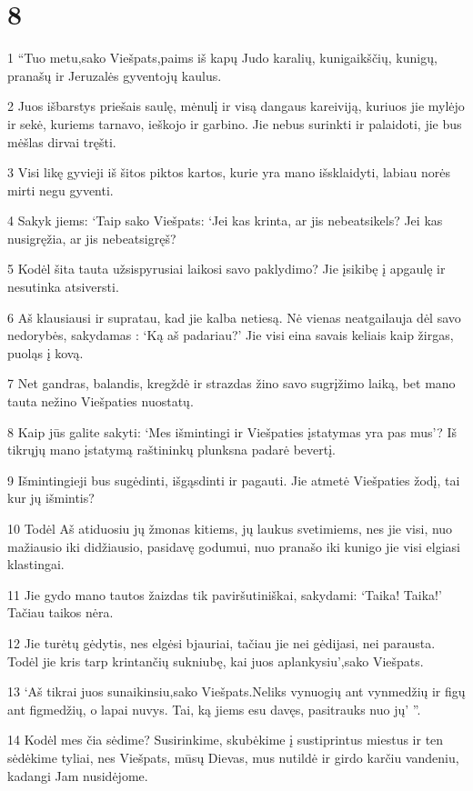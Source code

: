 \chapter{8}


\par 1 “Tuo metu,­sako Viešpats,­paims iš kapų Judo karalių, kunigaikščių, kunigų, pranašų ir Jeruzalės gyventojų kaulus. 
\par 2 Juos išbarstys priešais saulę, mėnulį ir visą dangaus kareiviją, kuriuos jie mylėjo ir sekė, kuriems tarnavo, ieškojo ir garbino. Jie nebus surinkti ir palaidoti, jie bus mėšlas dirvai tręšti. 
\par 3 Visi likę gyvieji iš šitos piktos kartos, kurie yra mano išsklaidyti, labiau norės mirti negu gyventi. 
\par 4 Sakyk jiems: ‘Taip sako Viešpats: ‘Jei kas krinta, ar jis nebeatsikels? Jei kas nusigręžia, ar jis nebeatsigręš? 
\par 5 Kodėl šita tauta užsispyrusiai laikosi savo paklydimo? Jie įsikibę į apgaulę ir nesutinka atsiversti. 
\par 6 Aš klausiausi ir supratau, kad jie kalba netiesą. Nė vienas neatgailauja dėl savo nedorybės, sakydamas : ‘Ką aš padariau?’ Jie visi eina savais keliais kaip žirgas, puoląs į kovą. 
\par 7 Net gandras, balandis, kregždė ir strazdas žino savo sugrįžimo laiką, bet mano tauta nežino Viešpaties nuostatų. 
\par 8 Kaip jūs galite sakyti: ‘Mes išmintingi ir Viešpaties įstatymas yra pas mus’? Iš tikrųjų mano įstatymą raštininkų plunksna padarė bevertį. 
\par 9 Išmintingieji bus sugėdinti, išgąsdinti ir pagauti. Jie atmetė Viešpaties žodį, tai kur jų išmintis? 
\par 10 Todėl Aš atiduosiu jų žmonas kitiems, jų laukus svetimiems, nes jie visi, nuo mažiausio iki didžiausio, pasidavę godumui, nuo pranašo iki kunigo jie visi elgiasi klastingai. 
\par 11 Jie gydo mano tautos žaizdas tik paviršutiniškai, sakydami: ‘Taika! Taika!’ Tačiau taikos nėra. 
\par 12 Jie turėtų gėdytis, nes elgėsi bjauriai, tačiau jie nei gėdijasi, nei parausta. Todėl jie kris tarp krintančių sukniubę, kai juos aplankysiu’,­sako Viešpats. 
\par 13 ‘Aš tikrai juos sunaikinsiu,­sako Viešpats.­Neliks vynuogių ant vynmedžių ir figų ant figmedžių, o lapai nuvys. Tai, ką jiems esu davęs, pasitrauks nuo jų’ ”. 
\par 14 Kodėl mes čia sėdime? Susirinkime, skubėkime į sustiprintus miestus ir ten sėdėkime tyliai, nes Viešpats, mūsų Dievas, mus nutildė ir girdo karčiu vandeniu, kadangi Jam nusidėjome. 
